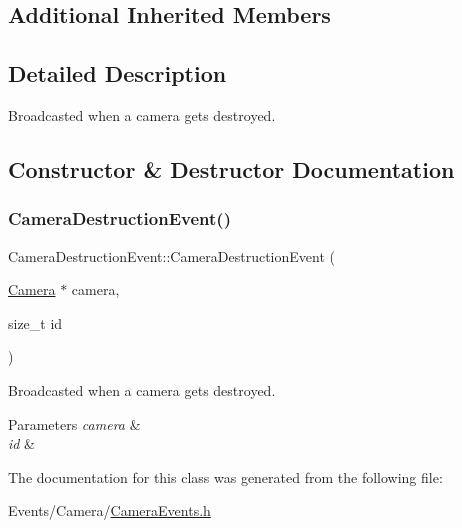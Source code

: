 \subsection*{Additional Inherited Members}


\subsection{Detailed Description}
Broadcasted when a camera gets destroyed. 

\subsection{Constructor \& Destructor Documentation}
\mbox{\label{classCameraDestructionEvent_add18fdf0c985ffd437a0b204b51111c3}} 
\subsubsection{\texorpdfstring{Camera\+Destruction\+Event()}{CameraDestructionEvent()}}
{\footnotesize\ttfamily Camera\+Destruction\+Event\+::\+Camera\+Destruction\+Event (\begin{DoxyParamCaption}\item[{\hyperlink{classCamera}{Camera} $\ast$}]{camera,  }\item[{size\+\_\+t}]{id }\end{DoxyParamCaption})\hspace{0.3cm}{\ttfamily [inline]}}



Broadcasted when a camera gets destroyed. 


\begin{DoxyParams}{Parameters}
{\em camera} & \\
\hline
{\em id} & \\
\hline
\end{DoxyParams}


The documentation for this class was generated from the following file\+:\begin{DoxyCompactItemize}
\item 
Events/\+Camera/\hyperlink{CameraEvents_8h}{Camera\+Events.\+h}\end{DoxyCompactItemize}
